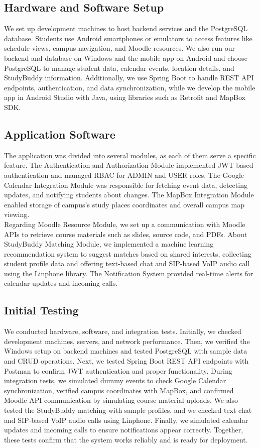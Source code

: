 \documentclass[12pt]{article}
\begin{document}
\subsection{Hardware and Software Setup}  
We set up development machines to host backend services and the PostgreSQL database. 
Students use Android smartphones or emulators to access features like schedule views, campus navigation, and Moodle resources. 
We also run our backend and database on Windows and the mobile app on Android and choose PostgreSQL to manage student data, calendar events, location details, and StudyBuddy information. 
Additionally, we use Spring Boot to handle REST API endpoints, authentication, and data synchronization, while we develop the mobile app in Android Studio with Java, using libraries such as Retrofit and MapBox SDK.

\subsection{Application Software} 
The application was divided into several modules, as each of them serve a specific feature.
The Authentication and Authorization Module implemented JWT-based authentication and managed RBAC for ADMIN and USER roles.
The Google Calendar Integration Module was responsible for fetching event data, detecting updates, and notifying students about changes.
The MapBox Integration Module enabled storage of campus's study places coordinates and overall campus map viewing. \\

Regarding Moodle Resource Module, we set up a communication with Moodle APIs to retrieve course materials such as slides, source code, and PDFs.
About StudyBuddy Matching Module, we implemented a machine learning recommendation system to suggest matches based on shared interests, collecting student profile data and offering text-based chat and SIP-based VoIP audio call using the Linphone library.
The Notification System provided real-time alerts for calendar updates and incoming calls.

\subsection{Initial Testing}
We conducted hardware, software, and integration tests. 
Initially, we checked development machines, servers, and network performance. 
Then, we verified the Windows setup on backend machines and tested PostgreSQL with sample data and CRUD operations. 
Next, we tested Spring Boot REST API endpoints with Postman to confirm JWT authentication and proper functionality. 
During integration tests, we simulated dummy events to check Google Calendar synchronization, verified campus coordinates with MapBox, and confirmed Moodle API communication by simulating course material uploads. 
We also tested the StudyBuddy matching with sample profiles, and we checked text chat and SIP-based VoIP audio calls using Linphone. 
Finally, we simulated calendar updates and incoming calls to ensure notifications appear correctly. 
Together, these tests confirm that the system works reliably and is ready for deployment.
\end{document}
